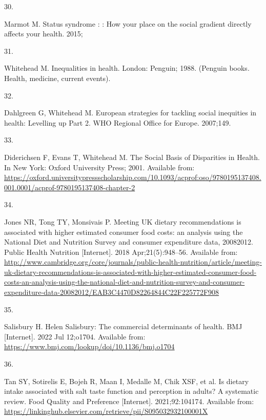 \documentclass[
]{article}
\newlength{\cslhangindent}
\newlength{\csllabelwidth}
\newlength{\cslentryspacingunit} %
\newenvironment{CSLReferences}[2] %
 {%
  \setlength{\parindent}{0pt}
  \ifodd #1
  \let\oldpar\par
  \def\par{\hangindent=\cslhangindent\oldpar}
  \fi
  \setlength{\parskip}{#2\cslentryspacingunit}
 }%
 {}
\newcommand{\CSLLeftMargin}[1]{\parbox[t]{\csllabelwidth}{#1}}
\newcommand{\CSLRightInline}[1]{\parbox[t]{\linewidth - \csllabelwidth}{#1}\break}
\begin{document}
\begin{CSLReferences}{0}{0}
\leavevmode{}%
\CSLLeftMargin{30. }%
\CSLRightInline{Marmot M. Status syndrome : : How your place on the
social gradient directly affects your health. 2015; }

\leavevmode{}%
\CSLLeftMargin{31. }%
\CSLRightInline{Whitehead M. Inequalities in health. London: Penguin;
1988. (Penguin books. Health, medicine, current events). }

\leavevmode{}%
\CSLLeftMargin{32. }%
\CSLRightInline{Dahlgreen G, Whitehead M. European strategies for
tackling social inequities in health: Levelling up Part 2. WHO Regional
Office for Europe. 2007;149. }

\leavevmode{}%
\CSLLeftMargin{33. }%
\CSLRightInline{Diderichsen F, Evans T, Whitehead M. The Social Basis of
Disparities in Health. In New York: Oxford University Press; 2001.
Available from:
\url{https://oxford.universitypressscholarship.com/10.1093/acprof:oso/9780195137408.001.0001/acprof-9780195137408-chapter-2}}

\leavevmode{}%
\CSLLeftMargin{34. }%
\CSLRightInline{Jones NR, Tong TY, Monsivais P. Meeting UK dietary
recommendations is associated with higher estimated consumer food costs:
an analysis using the National Diet and Nutrition Survey and consumer
expenditure data, 2008{\textendash}2012. Public Health Nutrition
{[}Internet{]}. 2018 Apr;21(5):948--56. Available from:
\url{http://www.cambridge.org/core/journals/public-health-nutrition/article/meeting-uk-dietary-recommendations-is-associated-with-higher-estimated-consumer-food-costs-an-analysis-using-the-national-diet-and-nutrition-survey-and-consumer-expenditure-data-20082012/EAB3C4470D82264844C22F225772F908}}

\leavevmode{}%
\CSLLeftMargin{35. }%
\CSLRightInline{Salisbury H. Helen Salisbury: The commercial
determinants of health. BMJ {[}Internet{]}. 2022 Jul 12;o1704. Available
from: \url{https://www.bmj.com/lookup/doi/10.1136/bmj.o1704}}

\leavevmode{}%
\CSLLeftMargin{36. }%
\CSLRightInline{Tan SY, Sotirelis E, Bojeh R, Maan I, Medalle M, Chik
XSF, et al. Is dietary intake associated with salt taste function and
perception in adults? A systematic review. Food Quality and Preference
{[}Internet{]}. 2021;92:104174. Available from:
\url{https://linkinghub.elsevier.com/retrieve/pii/S095032932100001X}}


\end{CSLReferences}
\end{document}
